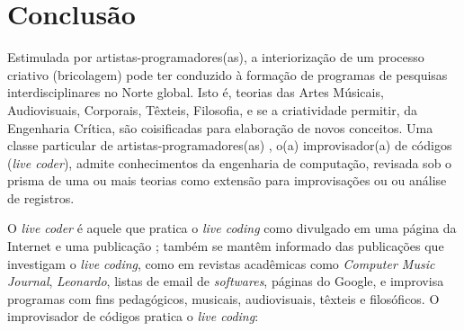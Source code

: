 \chapter*[Conclusão]{Conclusão}\label{conclusao}

Estimulada por artistas-programadores(as), a interiorização de um processo criativo (bricolagem) pode ter conduzido à formação de programas de pesquisas interdisciplinares no Norte global. Isto é, teorias das Artes Músicais, Audiovisuais, Corporais, Têxteis, Filosofia, e se a criatividade permitir, da Engenharia Crítica, são coisificadas para elaboração de novos conceitos. Uma classe particular de artistas-programadores(as) \cite[p.~16]{McLean2011}, o(a) improvisador(a) de códigos (\emph{live coder}), admite conhecimentos da engenharia de computação, revisada sob o prisma de uma ou mais teorias   como extensão para improvisações ou ou análise de registros.

O \emph{live coder} é aquele que pratica o \emph{live coding} como divulgado em uma página da Internet e uma publicação \cite{ward_live_2004}; também se mantêm informado das publicações que investigam o \emph{live coding}, como em revistas acadêmicas como \emph{Computer Music Journal}, \emph{Leonardo}, listas de email de \emph{softwares}, páginas do Google, e improvisa programas com fins pedagógicos, musicais, audiovisuais, têxteis e filosóficos. O improvisador de códigos pratica o \emph{live coding}:




